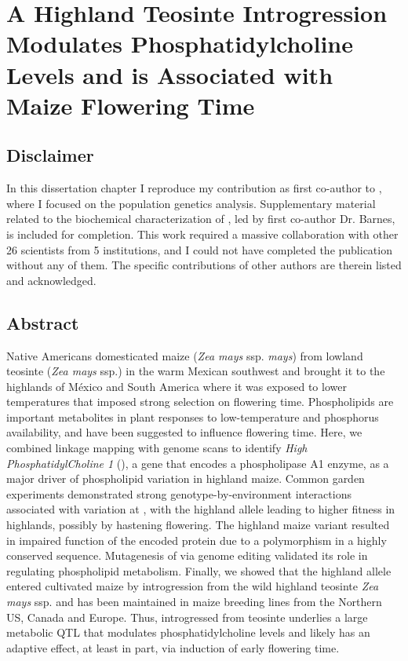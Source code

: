 \chapter{A Highland Teosinte Introgression Modulates Phosphatidylcholine Levels and is Associated with Maize Flowering Time}
\label{chap-one}

\newrefsection

\section{Disclaimer}
In this dissertation chapter I reproduce my contribution as first co-author to \citep{barnes2022}, where I focused on the population genetics analysis. Supplementary material related to the biochemical characterization of \hpc, led by first co-author Dr. Barnes,  is included for completion.
This work required a massive collaboration with other 26 scientists from 5 institutions, and I could not have completed the publication without any of them.
The specific contributions of other authors are therein listed and acknowledged.

\section{Abstract}

Native Americans domesticated maize (\textit{Zea mays} ssp. \textit{mays}) from lowland teosinte \parv (\textit{Zea mays} ssp.\parv) in the warm Mexican southwest and brought it to the highlands of M\'exico and South America where it was exposed to lower temperatures that imposed strong selection on flowering time.
Phospholipids are important metabolites in plant responses to low-temperature and phosphorus availability, and have been suggested to influence flowering time.
Here, we combined linkage mapping with genome scans to identify \textit{High PhosphatidylCholine 1} (\hpc), a gene that encodes a phospholipase A1 enzyme, as a major driver of phospholipid variation in highland maize. 
Common garden experiments demonstrated strong genotype-by-environment interactions associated with variation at \hpc, with the highland \hpc allele leading to higher fitness in highlands, possibly by hastening flowering. 
The highland maize \hpc variant resulted in impaired function of the encoded protein due to a polymorphism in a highly conserved sequence. 
Mutagenesis of \hpc via genome editing validated its role in regulating phospholipid metabolism. 
Finally, we showed that the highland \hpc allele entered cultivated maize by introgression from the wild highland teosinte \textit{Zea mays} ssp. \mex and has been maintained in maize breeding lines from the Northern US, Canada and Europe.
Thus, \hpc introgressed from teosinte \mex underlies a large metabolic QTL that modulates phosphatidylcholine levels and likely has an adaptive effect, at least in part, via induction of early flowering time.

